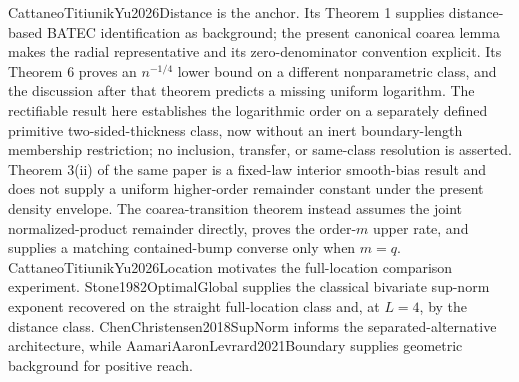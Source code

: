 CattaneoTitiunikYu2026Distance is the anchor.  Its Theorem 1 supplies distance-based BATEC identification as background; the present canonical coarea lemma makes the radial representative and its zero-denominator convention explicit.  Its Theorem 6 proves an \(n^{-1/4}\) lower bound on a different nonparametric class, and the discussion after that theorem predicts a missing uniform logarithm.  The rectifiable result here establishes the logarithmic order on a separately defined primitive two-sided-thickness class, now without an inert boundary-length membership restriction; no inclusion, transfer, or same-class resolution is asserted.  Theorem 3(ii) of the same paper is a fixed-law interior smooth-bias result and does not supply a uniform higher-order remainder constant under the present density envelope.  The coarea-transition theorem instead assumes the joint normalized-product remainder directly, proves the order-\(m\) upper rate, and supplies a matching contained-bump converse only when \(m=q\).  CattaneoTitiunikYu2026Location motivates the full-location comparison experiment.  Stone1982OptimalGlobal supplies the classical bivariate sup-norm exponent recovered on the straight full-location class and, at \(L=4\), by the distance class.  ChenChristensen2018SupNorm informs the separated-alternative architecture, while AamariAaronLevrard2021Boundary supplies geometric background for positive reach.